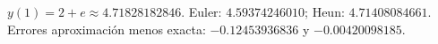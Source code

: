 $y(1)=2+e\approx4.71828182846$. Euler: $4.59374246010$; Heun: $4.71408084661$. Errores aproximación menos exacta: $-0.12453936836$ y $-0.00420098185$.
